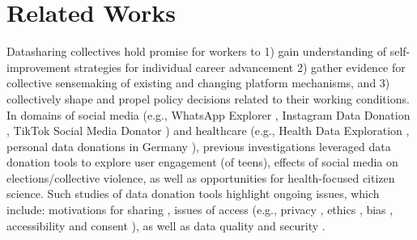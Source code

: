 
\section{Related Works}
Datasharing collectives hold promise for workers to 1) gain understanding of self-improvement strategies for individual career advancement 2) gather evidence for collective sensemaking of existing and changing platform mechanisms, and 3) collectively shape and propel policy decisions related to their working conditions. 
In domains of social media (e.g., WhatsApp Explorer \citep{whatsapp}, Instagram Data Donation \citep{instagram}, TikTok Social Media Donator \citep{zannettou2023leveraging}) and healthcare (e.g., Health Data Exploration \cite{bietz2019data}, personal data donations in Germany \cite{strotbaum2019your}), previous investigations leveraged data donation tools to explore user engagement (of teens), effects of social media on elections/collective violence, as well as opportunities for health-focused citizen science. Such studies of data donation tools highlight ongoing issues, which include: motivations for sharing \cite{bietz2019data, willingness}, issues of access (e.g., privacy \cite{carriere2023best}, ethics \cite{willingness}, bias \cite{nonparticipation}, accessibility \cite{donations_health} and consent \cite{boeschoten2023port, osd2f}), as well as data quality \cite{strotbaum2019your} and security \cite{osd2f}. 


